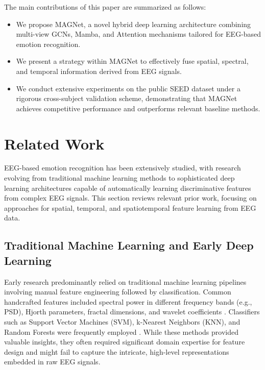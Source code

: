 \documentclass[runningheads]{llncs}
\begin{document}
The main contributions of this paper are summarized as follows:
\begin{itemize}
    \item We propose MAGNet, a novel hybrid deep learning architecture combining multi-view GCNs, Mamba, and Attention mechanisms tailored for EEG-based emotion recognition.
    \item We present a strategy within MAGNet to effectively fuse spatial, spectral, and temporal information derived from EEG signals.
    \item We conduct extensive experiments on the public SEED dataset under a rigorous cross-subject validation scheme, demonstrating that MAGNet achieves competitive performance and outperforms relevant baseline methods.
\end{itemize}




\section{Related Work}
\label{sec:related_work}

EEG-based emotion recognition has been extensively studied, with research evolving from traditional machine learning methods to sophisticated deep learning architectures capable of automatically learning discriminative features from complex EEG signals. This section reviews relevant prior work, focusing on approaches for spatial, temporal, and spatiotemporal feature learning from EEG data.

\subsection{Traditional Machine Learning and Early Deep Learning}
Early research predominantly relied on traditional machine learning pipelines involving manual feature engineering followed by classification. Common handcrafted features included spectral power in different frequency bands (e.g., PSD), Hjorth parameters, fractal dimensions, and wavelet coefficients \cite{cite_traditional_features_review}. Classifiers such as Support Vector Machines (SVM), k-Nearest Neighbors (KNN), and Random Forests were frequently employed \cite{cite_traditional_classifiers}. While these methods provided valuable insights, they often required significant domain expertise for feature design and might fail to capture the intricate, high-level representations embedded in raw EEG signals.
\end{document}
